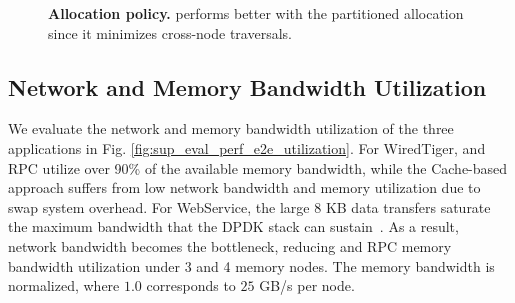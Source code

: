 \begin{figure}[b]
\centering
  \caption[Allocation policy]{\textbf{Allocation policy.} \pulse performs better with the partitioned allocation since it minimizes cross-node traversals.}
\end{figure}


\subsection{Network and Memory Bandwidth Utilization} 
We evaluate the network and memory bandwidth utilization of the three applications in Fig. \ref{fig:sup_eval_perf_e2e_utilization}. For WiredTiger, \pulse and RPC utilize over 90\% of the available memory bandwidth, while the Cache-based approach suffers from low network bandwidth and memory utilization due to swap system overhead. For WebService, the large 8 KB data transfers saturate the maximum bandwidth that the DPDK stack can sustain~\cite{erpc}. As a result, network bandwidth becomes the bottleneck, reducing \pulse and RPC memory bandwidth utilization under 3 and 4 memory nodes. The memory bandwidth is normalized, where $1.0$ corresponds to $25$ GB/s per node.




